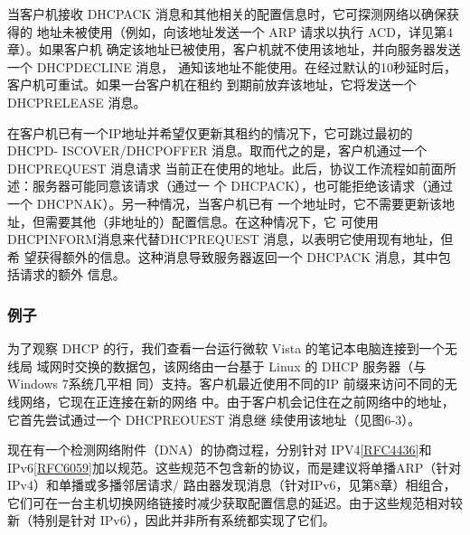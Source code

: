 当客户机接收 DHCPACK 消息和其他相关的配置信息时，它可探测网络以确保获得的
地址未被使用（例如，向该地址发送一个 ARP 请求以执行 ACD，详见第4章）。如果客户机
确定该地址已被使用，客户机就不使用该地址，并向服务器发送一个 DHCPDECLINE 消息，
通知该地址不能使用。在经过默认的10秒延时后，客户机可重试。如果一台客户机在租约
到期前放弃该地址，它将发送一个 DHCPRELEASE 消息。

在客户机已有一个IP地址并希望仅更新其租约的情况下，它可跳过最初的 DHCPD-
ISCOVER/DHCPOFFER 消息。取而代之的是，客户机通过一个 DHCPREQUEST 消息请求
当前正在使用的地址。此后，协议工作流程如前面所述：服务器可能同意该请求（通过一
个 DHCPACK），也可能拒绝该请求（通过一个 DHCPNAK）。另一种情况，当客户机已有
一个地址时，它不需要更新该地址，但需要其他（非地址的）配置信息。在这种情况下，它
可使用 DHCPINFORM消息来代替DHCPREQUEST 消息，以表明它使用现有地址，但希
望获得额外的信息。这种消息导致服务器返回一个 DHCPACK 消息，其中包括请求的额外
信息。

\subsubsection{例子}
为了观察 DHCP 的行，我们查看一台运行微软 Vista 的笔记本电脑连接到一个无线局
域网时交换的数据包，该网络由一台基于 Linux 的 DHCP 服务器（与Windows 7系统几平相
同）支持。客户机最近使用不同的IP 前缀来访问不同的无线网络，它现在正连接在新的网络
中。由于客户机会记住在之前网络中的地址，它首先尝试通过一个 DHCPREOUEST 消息继
续使用该地址（见图6-3）。

\begin{tcolorbox}
    现在有一个检测网络附件（DNA）的协商过程，分别针对 IPV4\href{https://www.rfc-editor.org/rfc/rfc4436}{\href{https://www.rfc-editor.org/rfc/rfc4436}{[RFC4436]}}和
    IPv6\href{https://www.rfc-editor.org/rfc/rfc6059}{\href{https://www.rfc-editor.org/rfc/rfc6059}{[RFC6059]}}加以规范。这些规范不包含新的协议，而是建议将单播ARP（针对
    IPv4）和单播或多播邻居请求/ 路由器发现消息（针对IPv6，见第8章）相组合，
    它们可在一台主机切换网络链接时减少获取配置信息的延迟。由于这些规范相对较
    新（特别是针对 IPv6），因此并非所有系统都实现了它们。
\end{tcolorbox}


